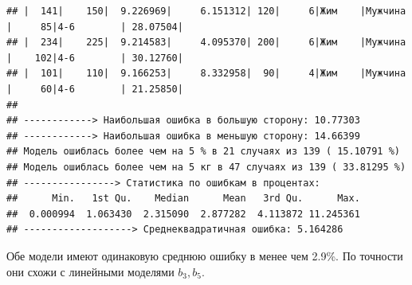 \documentclass[
]{article}
\begin{document}
\begin{verbatim}
## |  141|    150|  9.226969|     6.151312| 120|     6|Жим    |Мужчина |     85|4-6        | 28.07504|
## |  234|    225|  9.214583|     4.095370| 200|     6|Жим    |Мужчина |    102|4-6        | 30.12760|
## |  101|    110|  9.166253|     8.332958|  90|     4|Жим    |Мужчина |     60|4-6        | 21.25850|
## 
## ------------> Наибольшая ошибка в большую сторону: 10.77303 
## ------------> Наибольшая ошибка в меньшую сторону: 14.66399 
## Модель ошиблась более чем на 5 % в 21 случаях из 139 ( 15.10791 %)
## Модель ошиблась более чем на 5 кг в 47 случаях из 139 ( 33.81295 %)
## ----------------> Статистика по ошибкам в процентах:
##      Min.   1st Qu.    Median      Mean   3rd Qu.      Max. 
##  0.000994  1.063430  2.315090  2.877282  4.113872 11.245361 
## -------------------> Среднеквадратичная ошибка: 5.164286
\end{verbatim}

Обе модели имеют одинаковую среднюю ошибку в менее чем 2.9\%. По
точности они схожи с линейными моделями \(b_3,b_5\).
\end{document}
